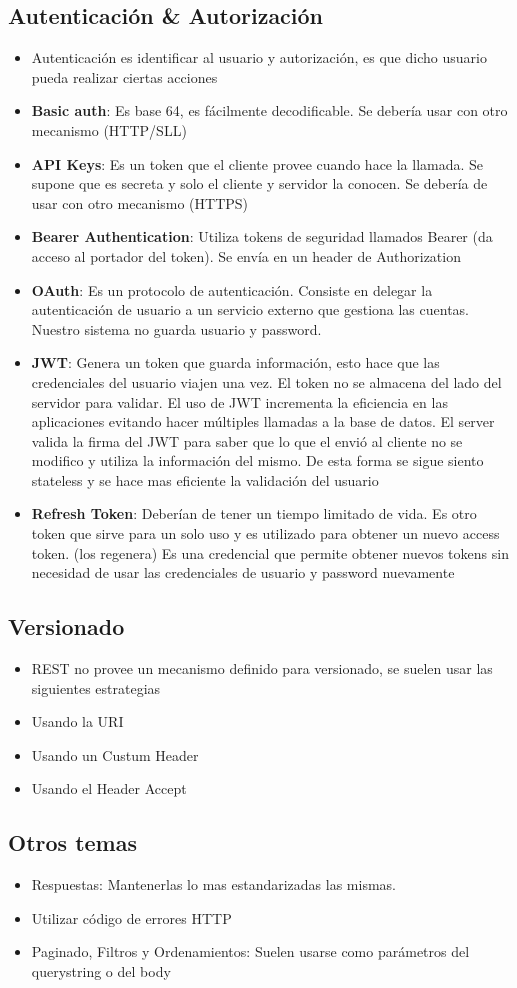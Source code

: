 \subsection*{Autenticación \& Autorización}

\begin{itemize}
\item Autenticación es identificar al usuario y autorización, es que dicho usuario pueda realizar ciertas acciones
\item \textbf{Basic auth}: Es base 64, es fácilmente decodificable. Se debería usar con otro mecanismo (HTTP/SLL)
\item \textbf{API Keys}: Es un token que el cliente provee cuando hace la llamada. Se supone que es secreta y solo el cliente y servidor la conocen. Se debería de usar con otro mecanismo (HTTPS)
\item \textbf{Bearer Authentication}: Utiliza tokens de seguridad llamados Bearer (da acceso al portador del token). Se envía en un header de Authorization
\item \textbf{OAuth}: Es un protocolo de autenticación. Consiste en delegar la autenticación de usuario a un servicio externo que gestiona las cuentas. Nuestro sistema no guarda usuario y password.
\item \textbf{JWT}: Genera un token que guarda información, esto hace que las credenciales del usuario viajen una vez. El token no se almacena del lado del servidor para validar. El uso de JWT incrementa la eficiencia en las aplicaciones evitando hacer múltiples llamadas a la base de datos. El server valida la firma del JWT para saber que lo que el envió al cliente no se modifico y utiliza la información del mismo. De esta forma se sigue siento stateless y se hace mas eficiente la validación del usuario
\item \textbf{Refresh Token}: Deberían de tener un tiempo limitado de vida. Es otro token que sirve para un solo uso y es utilizado para obtener un nuevo access token. (los regenera) Es una credencial que permite obtener nuevos tokens sin necesidad de usar las credenciales de usuario y password nuevamente
\end{itemize}


\subsection*{Versionado}
\begin{itemize}
\item REST no provee un mecanismo definido para versionado, se suelen usar las siguientes estrategias
\item Usando la URI
\item Usando un Custum Header
\item Usando el Header Accept
\end{itemize}


\subsection*{Otros temas}

\begin{itemize}
\item Respuestas: Mantenerlas lo mas estandarizadas las mismas.
\item Utilizar código de errores HTTP
\item Paginado, Filtros y Ordenamientos: Suelen usarse como parámetros del querystring o del body
\end{itemize}
